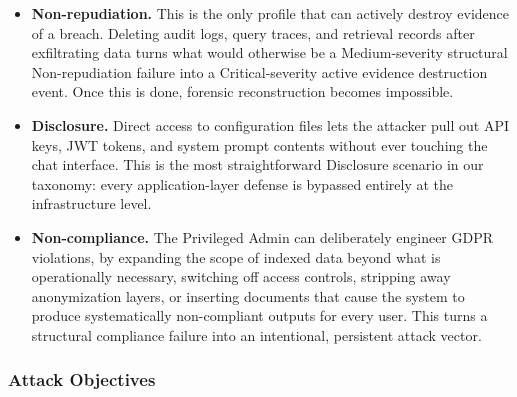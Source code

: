\documentclass[12pt,a4paper]{report}
\begin{document}
\begin{prosebox}
\begin{itemize}[leftmargin=1.4em, itemsep=5pt]
  \item \textbf{Non-repudiation.} This is the only profile that can
        actively destroy evidence of a breach. Deleting audit logs, query
        traces, and retrieval records after exfiltrating data turns what
        would otherwise be a Medium-severity structural Non-repudiation
        failure into a Critical-severity active evidence destruction event.
        Once this is done, forensic reconstruction becomes impossible.

  \item \textbf{Disclosure.} Direct access to configuration files lets the
        attacker pull out API keys, JWT tokens, and system prompt contents
        without ever touching the chat interface. This is the most
        straightforward Disclosure scenario in our taxonomy: every
        application-layer defense is bypassed entirely at the infrastructure
        level.

  \item \textbf{Non-compliance.} The Privileged Admin can deliberately
        engineer GDPR violations, by expanding the scope of indexed data
        beyond what is operationally necessary, switching off access controls,
        stripping away anonymization layers, or inserting documents that cause
        the system to produce systematically non-compliant outputs for every
        user. This turns a structural compliance failure into an intentional,
        persistent attack vector.
\end{itemize}
\end{prosebox}

\subsubsection{Attack Objectives}
\end{document}
